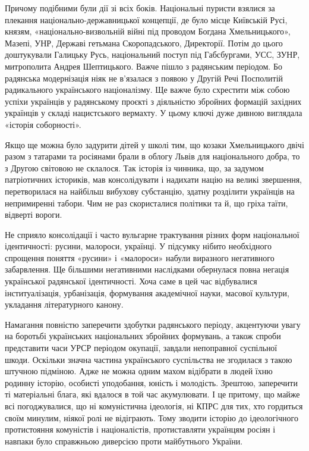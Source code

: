 Причому подібними були дії зі всіх боків. Національні пуристи взялися за плекання національно-державницької концепції, де було місце Київській Русі, князям, «національно-визвольній війні під проводом Богдана Хмельницького», Мазепі, УНР, Державі гетьмана Скоропадського, Директорії. Потім до цього доштукували Галицьку Русь, національний поступ під Габсбургами, УСС, ЗУНР, митрополита Андрея Шептицького. Важче пішло з радянським періодом. Бо радянська модернізація ніяк не в’язалася з появою у Другій Речі Посполитій радикального українського націоналізму. Ще важче було схрестити між собою успіхи українців у радянському проєкті з діяльністю збройних формацій західних українців у складі нацистського вермахту. У цьому ключі дуже дивною виглядала «історія соборності».

Якщо ще можна було задурити дітей у школі тим, що козаки Хмельницького двічі
разом з татарами та росіянами брали в облогу Львів для національного добра, то
з Другою світовою не склалося. Так історія із чинника, що, за задумом
патріотичних істориків, мав консолідувати і надихати націю на великі звершення,
перетворилася на найбільш вибухову субстанцію, здатну розділити українців на
непримиренні табори. Чим не раз скористалися політики та й, що гріха таїти,
відверті вороги.

Не сприяло консолідації і часто вульгарне трактування різних форм національної
ідентичності: русини, малороси, українці. У підсумку нібито необхідного
спрощення поняття «русини» і «малороси» набули виразного негативного
забарвлення. Ще більшими негативними наслідками обернулася повна негація
української радянської ідентичності. Хоча саме в цей час відбувалися
інституалізація, урбанізація, формування академічної науки, масової культури,
укладання літературного канону.

Намагання повністю заперечити здобутки радянського періоду, акцентуючи увагу на
боротьбі українських національних збройних формувань, а також спроби
представити часи УРСР періодом окупації, завдали непоправної суспільної шкоди.
Оскільки значна частина українського суспільства не згодилася з такою штучною
підміною. Адже не можна одним махом відібрати в людей їхню родинну історію,
особисті уподобання, юність і молодість. Зрештою, заперечити ті матеріальні
блага, які вдалося в той час акумулювати. І це притому, що майже всі
погоджувалися, що ні комуністична ідеологія, ні КПРС для тих, хто гордиться
своїм минулим, ніякої ролі не відіграють. Тому зводити історію до ідеологічного
протистояння комуністів і націоналістів, протиставляти українцям росіян і
навпаки було справжньою диверсією проти майбутнього України.

